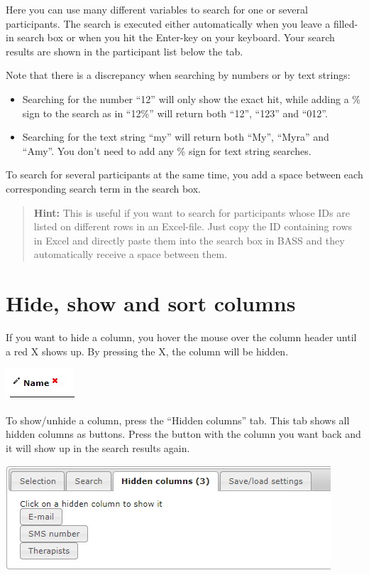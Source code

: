 \documentclass[
]{book}
\begin{document}
Here you can use many different variables to search for one or several participants. The search is executed either automatically when you leave a filled-in search box or when you hit the Enter-key on your keyboard. Your search results are shown in the participant list below the tab.

Note that there is a discrepancy when searching by numbers or by text strings:

\begin{itemize}
\item
  Searching for the number ``12'' will only show the exact hit, while adding a \% sign to the search as in ``12\%'' will return both ``12'', ``123'' and ``012''.
\item
  Searching for the text string ``my'' will return both ``My'', ``Myra'' and ``Amy''. You don't need to add any \% sign for text string searches.
\end{itemize}

To search for several participants at the same time, you add a space between each corresponding search term in the search box.

\begin{quote}
\textbf{Hint:} This is useful if you want to search for participants whose IDs are listed on different rows in an Excel-file. Just copy the ID containing rows in Excel and directly paste them into the search box in BASS and they automatically receive a space between them.
\end{quote}

\section{Hide, show and sort columns}\label{hide-show-and-sort-columns}

If you want to hide a column, you hover the mouse over the column header until a red X shows up. By pressing the X, the column will be hidden.

\includegraphics{images/hide-show-sort.png}

To show/unhide a column, press the ``Hidden columns'' tab. This tab shows all hidden columns as buttons. Press the button with the column you want back and it will show up in the search results again.

\includegraphics{images/hidden-columns.png}
\end{document}
